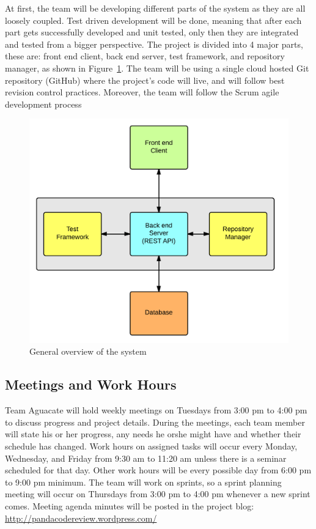 
At first, the team will be developing different parts of
the system as they are all loosely coupled. Test driven development will be
done, meaning that after each part gets successfully developed and unit tested,
only then they are integrated and tested from a bigger perspective. The project
is divided into 4 major parts, these are: front end client, back end server,
test framework, and repository manager, as shown in Figure~\ref{arqu}. The team
will be using a single cloud hosted Git repository (GitHub) where the project's
code will live, and will follow best revision control practices. Moreover, the
team will follow the Scrum agile development process %

\begin{figure}[H]
	\centering
	\includegraphics[width=\textwidth]{img/bigArquitectOverview}
	\caption{General overview of the system\label{arqu}}
\end{figure}

\subsection{Meetings and Work Hours}

Team Aguacate will hold weekly meetings on Tuesdays from 3:00 pm to 4:00 pm to
discuss progress and project details. During the meetings, each team member will
state his or her progress, any needs he orshe might have and whether their
schedule has changed. Work hours on assigned tasks will occur every Monday,
Wednesday, and Friday from 9:30 am to 11:20 am unless there is a seminar
scheduled for that day. Other work hours will be every possible day from 6:00 pm
to 9:00 pm minimum. The team will work on sprints, so a sprint planning meeting
will occur on Thursdays from 3:00 pm to 4:00 pm whenever a new sprint comes.
Meeting agenda minutes will be posted in the project blog:
\url{http://pandacodereview.wordpress.com/}

